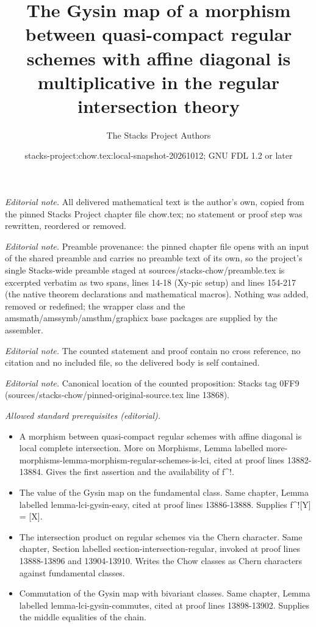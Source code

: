 \documentclass[10pt,a4paper]{amsart}
\title{The Gysin map of a morphism between quasi-compact regular schemes with affine diagonal is multiplicative in the regular intersection theory}
\author{The Stacks Project Authors}
\date{stacks-project:chow.tex:local-snapshot-20261012; GNU FDL 1.2 or later}
\theoremstyle{plain}
\theoremstyle{definition}
\theoremstyle{remark}
\numberwithin{equation}{subsection}
\begin{document}
\maketitle
\noindent\textit{Editorial note.} All delivered mathematical text is the author's own, copied from the pinned Stacks Project chapter file chow.tex; no statement or proof step was rewritten, reordered or removed.\par\medskip
\noindent\textit{Editorial note.} Preamble provenance: the pinned chapter file opens with an input of the shared preamble and carries no preamble text of its own, so the project's single Stacks-wide preamble staged at sources/stacks-chow/preamble.tex is excerpted verbatim as two spans, lines 14-18 (Xy-pic setup) and lines 154-217 (the native theorem declarations and mathematical macros). Nothing was added, removed or redefined; the wrapper class and the amsmath/amssymb/amsthm/graphicx base packages are supplied by the assembler.\par\medskip
\noindent\textit{Editorial note.} The counted statement and proof contain no cross reference, no citation and no included file, so the delivered body is self contained.\par\medskip
\noindent\textit{Editorial note.} Canonical location of the counted proposition: Stacks tag 0FF9 (sources/stacks-chow/pinned-original-source.tex line 13868).\par\medskip
\noindent\textit{Allowed standard prerequisites (editorial).}\begin{itemize}
\item A morphism between quasi-compact regular schemes with affine diagonal is local complete intersection. More on Morphisms, Lemma labelled more-morphisms-lemma-morphism-regular-schemes-is-lci, cited at proof lines 13882-13884. Gives the first assertion and the availability of f\textasciicircum{}!.
\item The value of the Gysin map on the fundamental class. Same chapter, Lemma labelled lemma-lci-gysin-easy, cited at proof lines 13886-13888. Supplies f\textasciicircum{}![Y] = [X].
\item The intersection product on regular schemes via the Chern character. Same chapter, Section labelled section-intersection-regular, invoked at proof lines 13888-13896 and 13904-13910. Writes the Chow classes as Chern characters against fundamental classes.
\item Commutation of the Gysin map with bivariant classes. Same chapter, Lemma labelled lemma-lci-gysin-commutes, cited at proof lines 13898-13902. Supplies the middle equalities of the chain.
\end{itemize}\medskip
\end{document}
